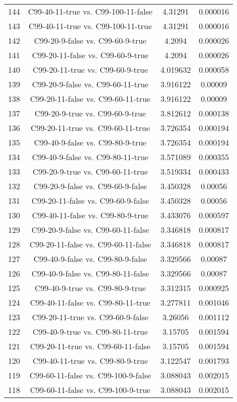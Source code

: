 \documentclass[a4paper,10pt]{article}
\begin{document}
\begin{landscape}
\begin{table}[!htp]
\begin{tabular}{cccc}
144&C99-40-11-true vs. C99-100-11-false&4.31291&0.000016\\
143&C99-40-11-true vs. C99-100-11-true&4.31291&0.000016\\
142&C99-20-9-false vs. C99-60-9-true&4.2094&0.000026\\
141&C99-20-11-false vs. C99-60-9-true&4.2094&0.000026\\
140&C99-20-11-true vs. C99-60-9-true&4.019632&0.000058\\
139&C99-20-9-false vs. C99-60-11-true&3.916122&0.00009\\
138&C99-20-11-false vs. C99-60-11-true&3.916122&0.00009\\
137&C99-20-9-true vs. C99-60-9-true&3.812612&0.000138\\
136&C99-20-11-true vs. C99-60-11-true&3.726354&0.000194\\
135&C99-40-9-false vs. C99-80-9-true&3.726354&0.000194\\
134&C99-40-9-false vs. C99-80-11-true&3.571089&0.000355\\
133&C99-20-9-true vs. C99-60-11-true&3.519334&0.000433\\
132&C99-20-9-false vs. C99-60-9-false&3.450328&0.00056\\
131&C99-20-11-false vs. C99-60-9-false&3.450328&0.00056\\
130&C99-40-11-false vs. C99-80-9-true&3.433076&0.000597\\
129&C99-20-9-false vs. C99-60-11-false&3.346818&0.000817\\
128&C99-20-11-false vs. C99-60-11-false&3.346818&0.000817\\
127&C99-40-9-false vs. C99-80-9-false&3.329566&0.00087\\
126&C99-40-9-false vs. C99-80-11-false&3.329566&0.00087\\
125&C99-40-9-true vs. C99-80-9-true&3.312315&0.000925\\
124&C99-40-11-false vs. C99-80-11-true&3.277811&0.001046\\
123&C99-20-11-true vs. C99-60-9-false&3.26056&0.001112\\
122&C99-40-9-true vs. C99-80-11-true&3.15705&0.001594\\
121&C99-20-11-true vs. C99-60-11-false&3.15705&0.001594\\
120&C99-40-11-true vs. C99-80-9-true&3.122547&0.001793\\
119&C99-60-11-false vs. C99-100-9-false&3.088043&0.002015\\
118&C99-60-11-false vs. C99-100-9-true&3.088043&0.002015\\

\end{tabular}
\end{table}
\end{landscape}
\end{document}
